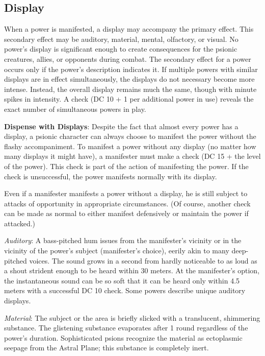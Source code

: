 \subsection{Display}
When a power is manifested, a display may accompany the primary effect. This secondary effect may be auditory, material, mental, olfactory, or visual. No power's display is significant enough to create consequences for the psionic creatures, allies, or opponents during combat. The secondary effect for a power occurs only if the power's description indicates it. If multiple powers with similar displays are in effect simultaneously, the displays do not necessary become more intense. Instead, the overall display remains much the same, though with minute spikes in intensity. A  check (DC 10 + 1 per additional power in use) reveals the exact number of simultaneous powers in play.

\textbf{Dispense with Displays}: Despite the fact that almost every power has a display, a psionic character can always choose to manifest the power without the flashy accompaniment. To manifest a power without any display (no matter how many displays it might have), a manifester must make a  check (DC 15 + the level of the power). This check is part of the action of manifesting the power. If the check is unsuccessful, the power manifests normally with its display.

Even if a manifester manifests a power without a display, he is still subject to attacks of opportunity in appropriate circumstances. (Of course, another  check can be made as normal to either manifest defensively or maintain the power if attacked.)

\textit{Auditory}: A bass-pitched hum issues from the manifester's vicinity or in the vicinity of the power's subject (manifester's choice), eerily akin to many deep-pitched voices. The sound grows in a second from hardly noticeable to as loud as a shout strident enough to be heard within 30 meters. At the manifester's option, the instantaneous sound can be so soft that it can be heard only within 4.5 meters with a successful DC 10  check. Some powers describe unique auditory displays.

\textit{Material}: The subject or the area is briefly slicked with a translucent, shimmering substance. The glistening substance evaporates after 1 round regardless of the power's duration. Sophisticated psions recognize the material as ectoplasmic seepage from the Astral Plane; this substance is completely inert.

